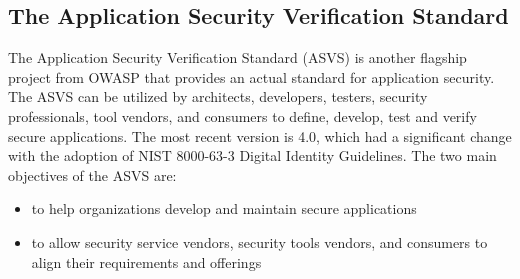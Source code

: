 \subsection{The Application Security Verification Standard}
The Application Security Verification Standard (ASVS) is another flagship project from OWASP that provides an actual standard for application security. The ASVS can be utilized by architects, developers, testers, security professionals, tool vendors, and consumers to define, develop, test and verify secure applications. The most recent version is 4.0, which had a significant change with the adoption of NIST 8000-63-3 Digital Identity Guidelines. The two main objectives of the ASVS are:

\begin{itemize}
    \item to help organizations develop and maintain secure applications
    \item to allow security service vendors, security tools vendors, and consumers to align their requirements and offerings
\end{itemize}

